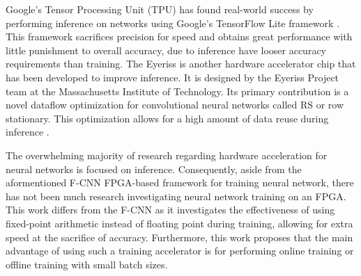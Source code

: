Google's Tensor Processing Unit (TPU) has found real-world success by performing inference on networks using Google's TensorFlow Lite framework \cite{TPU}. This framework sacrifices precision for speed and obtains great performance with little punishment to overall accuracy, due to inference have looser accuracy requirements than training. The Eyeriss is another hardware accelerator chip that has been developed to improve inference. It is designed by the Eyeriss Project team at the Massachusetts Institute of Technology. Its primary contribution is a novel dataflow optimization for convolutional neural networks called RS or row stationary. This optimization allows for a high amount of data reuse during inference \cite{eyeriss}.

The overwhelming majority of research regarding hardware acceleration for neural networks is focused on inference. Consequently, aside from the aformentioned F-CNN FPGA-based framework for training neural network, there has not been much research investigating neural network training on an FPGA. This work differs from the F-CNN as it investigates the effectiveness of using fixed-point arithmetic instead of floating point during training, allowing for extra speed at the sacrifice of accuracy. Furthermore, this work proposes that the main advantage of using such a training accelerator is for performing online training or offline training with small batch sizes.